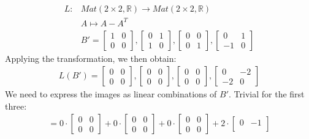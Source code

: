 \documentclass[a4paper, 12pt]{article}
\theoremstyle{definition}
\theoremstyle{definition}
\theoremstyle{definition}
\theoremstyle{definition}
\begin{document}
{\begin{align*}
	L: &  Mat(2 \times 2, \mathbb{R}) \rightarrow Mat(2 \times 2, \mathbb{R}) \\
	& A \mapsto A - A^T \\
	& B' = \begin{bmatrix}
		1 & 0 \\
		0 & 0 
	\end{bmatrix}, \begin{bmatrix}
		0 & 1 \\
		1 & 0 
	\end{bmatrix}, \begin{bmatrix}
		0 & 0 \\
		0 & 1
	\end{bmatrix}, \begin{bmatrix}
		0 & 1 \\
		-1 & 0 
	\end{bmatrix}	
\end{align*}
Applying the transformation, we then obtain: 
\begin{align*}  
	 L(B') = \begin{bmatrix}
		0 & 0 \\
		0 & 0 
	\end{bmatrix}, \begin{bmatrix}
		0 & 0 \\
		0 & 0 
	\end{bmatrix}, \begin{bmatrix}
		0 & 0 \\
		0 & 0
	\end{bmatrix}, \begin{bmatrix}
		0 & -2 \\
		-2 & 0 
	\end{bmatrix}	
\end{align*} 
We need to express the images as linear combinations of $B'$. Trivial for the first three: 
\begin{align*}  
	  = 0 \cdot \begin{bmatrix}
		0 & 0 \\
		0 & 0 
	\end{bmatrix} + 0 \cdot \begin{bmatrix}
		0 & 0 \\
		0 & 0 
	\end{bmatrix} + 0 \cdot \begin{bmatrix}
		0 & 0 \\
		0 & 0
	\end{bmatrix} + 2 \cdot  \begin{bmatrix}
		0 & -1 \\

\end{bmatrix}
\end{align*}}
\end{document}
